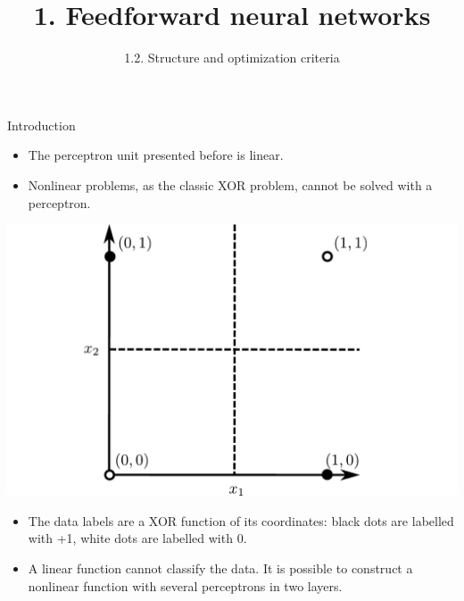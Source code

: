 \documentclass{beamer}
\title{1. Feedforward neural networks }
\subtitle{1.2. Structure and optimization criteria}
\begin{document}
\maketitle
\begin{frame}{Introduction}
\begin{itemize}
    \item The perceptron unit presented before is linear. 
    \item Nonlinear problems, as the classic XOR problem, cannot be solved with a perceptron. 
\end{itemize}
\begin{multicols}{2}
\begin{center}
\includegraphics[scale=0.2]{Module 1 (NN)/pics/xor_problem.pdf}
\end{center}

\columnbreak

\begin{itemize}
\item The data labels are a XOR function of its coordinates: 
black dots are labelled with +1, white dots are labelled with 0.
\end{itemize}
\end{multicols}

\begin{itemize}
    \item A linear function cannot classify the data. It is possible to construct a nonlinear function with several perceptrons in two layers.
\end{itemize}

\end{frame}
\end{document}
